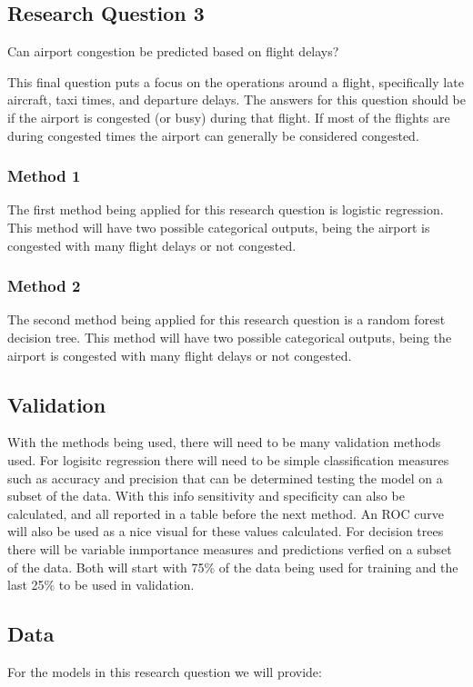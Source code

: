 \documentclass[a4paper,12pt]{article}
\begin{document}
\subsection{Research Question 3}
Can airport congestion be predicted based on flight delays?

This final question puts a focus on the operations around a flight, specifically late aircraft, taxi times, and departure delays. The answers for this question should be if the airport is 
congested (or busy) during that flight. If most of the flights are during congested times the airport can generally be considered congested.

\subsubsection{Method 1}
The first method being applied for this research question is logistic regression. This method will have two possible categorical outputs, being the airport is congested with many flight delays
or not congested.

\subsubsection{Method 2}
The second method being applied for this research question is a random forest decision tree. This method will have two possible categorical outputs, being the airport is congested with many flight delays
or not congested.

\subsection{Validation}
With the methods being used, there will need to be many validation methods used. For logisitc regression there will need to be simple classification measures such as accuracy and precision that can be determined
testing the model on a subset of the data. With this info sensitivity and specificity can also be calculated, and all reported in a table before the next method. An ROC curve will also be used as a nice visual for these values calculated.
For decision trees there will be variable inmportance measures and predictions verfied on a subset of the data. Both will start with 75\% of the data being used for training and the last 25\% to be used in validation.

\subsection{Data}
For the models in this research question we will provide:
\end{document}

